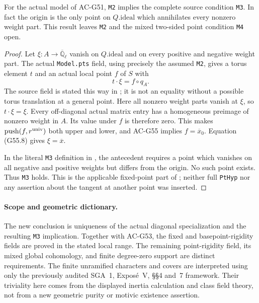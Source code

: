 \begin{corollary}
\label{AC-G55-M3}
For the actual model of AC-G51, \texttt{M2} implies
the complete source condition \texttt{M3}.
In fact the origin is the only point on
$Q.\mathrm{ideal}$ which annihilates every
nonzero weight part.
This result leaves \texttt{M2} and the mixed
two-sided point condition \texttt{M4} open.
\end{corollary}
\begin{proof}
Let $\xi:A\to\overline{\mathbb Q}_\ell$ vanish on
$Q.\mathrm{ideal}$ and on every positive and
negative weight part.
The actual \texttt{Model.pts} field, using
precisely the assumed \texttt{M2}, gives a torus
element $t$ and an actual local point $f$ of $S$
with
\[
                    t\cdot\xi=f\circ q_A.                    \tag{G55.8}
\]
The source field is stated this way in
;
it is not an equality without a possible torus
translation at a general point.
Here all nonzero weight parts vanish at $\xi$,
so $t\cdot\xi=\xi$.
Every off-diagonal actual matrix entry has a
homogeneous preimage of nonzero weight in $A$.
Its value under $f$ is therefore zero.
This makes $\operatorname{push}(f,r^{\rm univ})$
both upper and lower, and AC-G55 implies
$f=\overline{x}_0$.
Equation (G55.8) gives $\xi=\overline{x}$.

In the literal \texttt{M3} definition in
,
the antecedent requires a point which vanishes
on all negative and positive weights but differs
from the origin.  No such point exists.
Thus \texttt{M3} holds.
This is the applicable fixed-point part of
;
neither full \texttt{PtHyp} nor any assertion about
the tangent at another point was inserted.
\end{proof}

\paragraph{Scope and geometric dictionary.}
The new conclusion is uniqueness of the actual
diagonal specialization and the resulting
\texttt{M3} implication.  Together with AC-G53,
the fixed and basepoint-rigidity fields are
proved in the stated local range.
The remaining point-rigidity field, its mixed
global cohomology, and finite degree-zero
support are distinct requirements.
The finite unramified characters and covers
are interpreted using only the previously
audited SGA~1, Expos\'e~V, \S\S4 and~7 framework.
Their triviality here comes from the displayed
inertia calculation and class field theory,
not from a new geometric purity or motivic
existence assertion.
